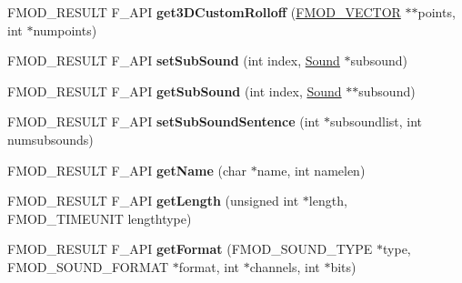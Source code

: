 \begin{DoxyCompactItemize}
\item 
F\+M\+O\+D\+\_\+\+R\+E\+S\+U\+LT F\+\_\+\+A\+PI {\bfseries get3\+D\+Custom\+Rolloff} (\hyperlink{struct_f_m_o_d___v_e_c_t_o_r}{F\+M\+O\+D\+\_\+\+V\+E\+C\+T\+OR} $\ast$$\ast$points, int $\ast$numpoints)\hypertarget{class_f_m_o_d_1_1_sound_aeff4d197c2a9edc1dd746b519d63f490}{}\label{class_f_m_o_d_1_1_sound_aeff4d197c2a9edc1dd746b519d63f490}

\item 
F\+M\+O\+D\+\_\+\+R\+E\+S\+U\+LT F\+\_\+\+A\+PI {\bfseries set\+Sub\+Sound} (int index, \hyperlink{class_f_m_o_d_1_1_sound}{Sound} $\ast$subsound)\hypertarget{class_f_m_o_d_1_1_sound_ab326892db719b2e98dc0d14b91b0a17c}{}\label{class_f_m_o_d_1_1_sound_ab326892db719b2e98dc0d14b91b0a17c}

\item 
F\+M\+O\+D\+\_\+\+R\+E\+S\+U\+LT F\+\_\+\+A\+PI {\bfseries get\+Sub\+Sound} (int index, \hyperlink{class_f_m_o_d_1_1_sound}{Sound} $\ast$$\ast$subsound)\hypertarget{class_f_m_o_d_1_1_sound_ae1f9dd4b19f536a11850961348d6210f}{}\label{class_f_m_o_d_1_1_sound_ae1f9dd4b19f536a11850961348d6210f}

\item 
F\+M\+O\+D\+\_\+\+R\+E\+S\+U\+LT F\+\_\+\+A\+PI {\bfseries set\+Sub\+Sound\+Sentence} (int $\ast$subsoundlist, int numsubsounds)\hypertarget{class_f_m_o_d_1_1_sound_a8d7e00c75eb46132351ff14069097cd0}{}\label{class_f_m_o_d_1_1_sound_a8d7e00c75eb46132351ff14069097cd0}

\item 
F\+M\+O\+D\+\_\+\+R\+E\+S\+U\+LT F\+\_\+\+A\+PI {\bfseries get\+Name} (char $\ast$name, int namelen)\hypertarget{class_f_m_o_d_1_1_sound_a448ce4d402d03d76c79f289565cae2c2}{}\label{class_f_m_o_d_1_1_sound_a448ce4d402d03d76c79f289565cae2c2}

\item 
F\+M\+O\+D\+\_\+\+R\+E\+S\+U\+LT F\+\_\+\+A\+PI {\bfseries get\+Length} (unsigned int $\ast$length, F\+M\+O\+D\+\_\+\+T\+I\+M\+E\+U\+N\+IT lengthtype)\hypertarget{class_f_m_o_d_1_1_sound_a3f0b77ce74332b1f358816eedfc6ca02}{}\label{class_f_m_o_d_1_1_sound_a3f0b77ce74332b1f358816eedfc6ca02}

\item 
F\+M\+O\+D\+\_\+\+R\+E\+S\+U\+LT F\+\_\+\+A\+PI {\bfseries get\+Format} (F\+M\+O\+D\+\_\+\+S\+O\+U\+N\+D\+\_\+\+T\+Y\+PE $\ast$type, F\+M\+O\+D\+\_\+\+S\+O\+U\+N\+D\+\_\+\+F\+O\+R\+M\+AT $\ast$format, int $\ast$channels, int $\ast$bits)\hypertarget{class_f_m_o_d_1_1_sound_a3b74a166eab897c4b01795aac95eceb1}{}\label{class_f_m_o_d_1_1_sound_a3b74a166eab897c4b01795aac95eceb1}


\end{DoxyCompactItemize}
